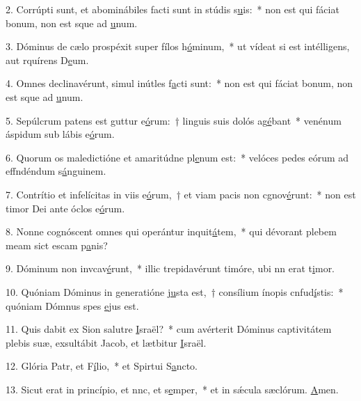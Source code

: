 2. Corrúpti sunt, et abominábiles facti sunt in stúdis s\uline{u}is:~* non est qui fáciat bonum, non est sque ad \uline{u}num.\par 
3. Dóminus de cælo prospéxit super fílos h\uline{ó}minum,~* ut vídeat si est intélligens, aut rquírens D\uline{e}um.\par 
4. Omnes declinavérunt, simul inútles f\uline{a}cti sunt:~* non est qui fáciat bonum, non est sque ad \uline{u}num.\par 
5. Sepúlcrum patens est guttur e\uline{ó}rum:~† linguis suis dolós ag\uline{é}bant~* venénum áspidum sub lábis e\uline{ó}rum.\par 
6. Quorum os maledictióne et amaritúdne pl\uline{e}num est:~* velóces pedes eórum ad effndéndum s\uline{á}nguinem.\par 
7. Contrítio et infelícitas in viis e\uline{ó}rum,~† et viam pacis non cgnov\uline{é}runt:~* non est timor Dei ante óclos e\uline{ó}rum.\par 
8. Nonne cognóscent omnes qui operántur inquit\uline{á}tem,~* qui dévorant plebem meam sict escam p\uline{a}nis?\par 
9. Dóminum non invcav\uline{é}runt,~* illic trepidavérunt timóre, ubi nn erat t\uline{i}mor.\par 
10. Quóniam Dóminus in generatióne \uline{ju}sta est,~† consílium ínopis cnfud\uline{í}stis:~* quóniam Dómnus spes \uline{e}jus est.\par 
11. Quis dabit ex Sion salutre \uline{I}sraël?~* cum avérterit Dóminus captivitátem plebis suæ, exsultábit Jacob, et lætbitur \uline{I}sraël.\par 
12. Glória Patr, et F\uline{í}lio,~* et Spirtui S\uline{a}ncto.\par 
13. Sicut erat in princípio, et nnc, et s\uline{e}mper,~* et in sǽcula sæclórum. \uline{A}men.\par 
